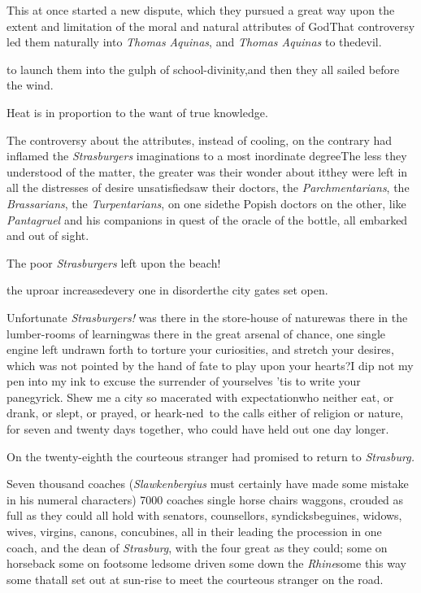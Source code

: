 \documentclass{article}
\begin{document}
This at once started a new dispute, which they pursued a great
way upon the extent and limitation of the moral and natural
attributes of God\tsk That controversy led them naturally into
\textit{Thomas} \textit{Aquinas}, and \textit{Thomas
Aquinas} to the\break devil.

to launch them into the gulph of school-divinity,\tsk and then they all
sailed before the wind.

Heat is in proportion to the want of true knowledge.

The controversy about the attributes, \etc instead of
cooling, on the contrary had inflamed the \textit{Strasburgers}
imaginations to a most inordinate degree\tsk The less they
understood of the matter, the greater was their wonder about
it\tsk they were left in all the distresses of desire
unsatisfied\tsk saw their doctors, the
\textit{Parchmentarians}, the \textit{Brassarians}, the
\textit{Turpentarians}, on one side\tsk the Popish
doctors
on the other, like \textit{Pantagruel} and his companions in
quest of the oracle of the bottle, all embarked and out of
sight.

\tsh The poor \textit{Strasburgers} left upon the
beach!

\noindent
{}\break
\tsk the uproar
increased\tsk every one in disorder\tsk the city gates set
open.\tsk

Unfortunate \textit{Strasburgers!} was there in the
store-house of nature\tsk was there in the lumber-rooms of
learning\tsk was there in the great arsenal of chance, one
single engine left undrawn forth to torture your
curiosities, and stretch your desires, which was not pointed
by the hand of fate to play upon your hearts?\tsk I dip not
my pen into my ink to excuse the surrender of yourselves\tsk
’tis to write your panegyrick. Shew me a city so macerated
with expectation\tsh who neither eat, or drank, or slept, or
prayed, or heark-\break ned\sic\ to the calls either of religion or
nature, for seven and twenty days together, who could have
held out one day longer.

On the twenty-eighth the courteous stranger had promised to
return to \textit{Strasburg.}

Seven thousand coaches (\textit{Slawkenber\-gius} must certainly have made some
mistake in his numeral characters) 7000\break
coaches single horse chairs\tsh{} waggons, crouded as full as they could all hold with senators, counsellors, 
syndicks\tsk beguines, widows, wives, virgins, canons,
concubines, all in their\break
{}
leading the procession in one coach, and the dean of \textit{Strasburg}, with the
four great \break
{}
as they could; some on horseback\tsh 
some on foot\tsk some led\tsk some driven\tsk
some down the \textit{Rhine}\tsk some this way\tsk
some that\tsk all set out at sun-rise to meet 
the courteous stranger on the road.
\end{document}

